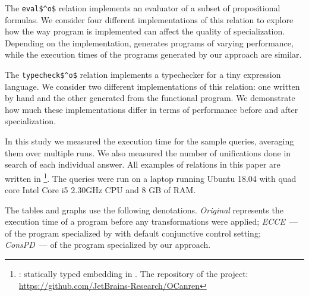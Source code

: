 
The \lstinline{eval$^o$} relation implements an evaluator of a subset of propositional formulas.
We consider four different implementations of this relation to explore how the way program is implemented can affect the quality of specialization.
Depending on the implementation, \ecce generates programs of varying performance, while the execution times of the programs generated by our approach are similar.

The \lstinline{typecheck$^o$} relation implements a typechecker for a tiny expression language.
We consider two different implementations of this relation: one written by hand and the other generated from the functional program.
We demonstrate how much these implementations differ in terms of performance before and after specialization.

In this study we measured the execution time for the sample queries, averaging them over multiple runs.
We also measured the number of unifications done in search of each individual answer.
All examples of \mk relations in this paper are written in \oc\footnote{\oc: statically typed \mk embedding in \ocaml. The repository of the project: \url{https://github.com/JetBrains-Research/OCanren}}.
The queries were run on a laptop running Ubuntu 18.04 with quad core Intel Core i5 2.30GHz CPU and 8 GB of RAM.

The tables and graphs use the following denotations.
\emph{Original} represents the execution time of a program before any transformations were applied; \emph{ECCE}~--- of the program specialized by \ecce with default conjunctive control setting; \emph{ConsPD}~--- of the program specialized by our approach.


